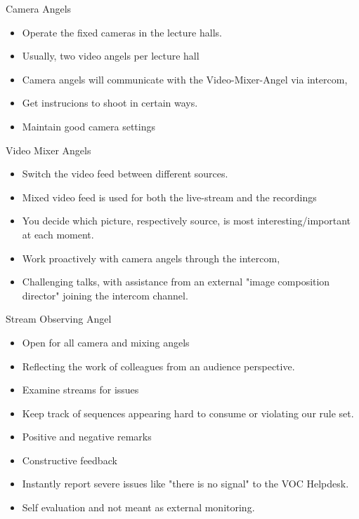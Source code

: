 \documentclass[aspectratio=169]{beamer}
\begin{document}
\begin{frame}{Camera Angels}
	\begin{itemize}
		\item Operate the fixed cameras in the lecture halls. 
		\item Usually, two video angels per lecture hall 
		\item Camera angels will communicate with the Video-Mixer-Angel via intercom,
		\item Get instrucions to shoot in certain ways. 
		\item Maintain good camera settings 
	\end{itemize}
\end{frame}

\begin{frame}{Video Mixer Angels}
	\begin{itemize}
		\item Switch the video feed between different sources. 
		\item Mixed video feed is used for both the live-stream and the recordings 
		\item You decide which picture, respectively source, is most interesting/important at each moment.
		\item Work proactively with camera angels through the intercom, 
		\item Challenging talks, with assistance from an external "image composition director" joining the intercom channel.
	\end{itemize}
\end{frame}

\begin{frame}{Stream Observing Angel}
	\begin{itemize}
		\item Open for all camera and mixing angels
		\item Reflecting the work of colleagues from an audience perspective.
		\item Examine streams for issues 
		\item Keep track of sequences appearing hard to consume or violating our rule set. 
		\item Positive and negative remarks 
		\item Constructive feedback 
		\item Instantly report severe issues like "there is no signal" to the VOC Helpdesk.
		\item Self evaluation and not meant as external monitoring. 
	\end{itemize}
\end{frame}
\end{document}
